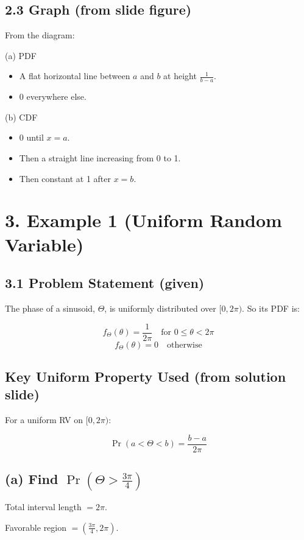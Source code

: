 \documentclass{article}
\begin{document}
\subsection*{2.3 Graph (from slide figure)}
From the diagram:

\noindent (a) PDF
\begin{itemize}
    \item A flat horizontal line between $a$ and $b$ at height $\frac{1}{b-a}$.
    \item 0 everywhere else.
\end{itemize}

\noindent (b) CDF
\begin{itemize}
    \item 0 until $x=a$.
    \item Then a straight line increasing from 0 to 1.
    \item Then constant at 1 after $x=b$.
\end{itemize}


\section*{3. Example 1 (Uniform Random Variable)}

\subsection*{3.1 Problem Statement (given)}
The phase of a sinusoid, $\Theta$, is uniformly distributed over $[0,2\pi)$.  
So its PDF is:

\[
f_\Theta(\theta)=\frac{1}{2\pi} \quad \text{for } 0\le \theta<2\pi
\]
\[
f_\Theta(\theta)=0 \quad \text{otherwise}
\]

\subsection*{Key Uniform Property Used (from solution slide)}
For a uniform RV on $[0,2\pi)$:

\[
\Pr(a<\Theta<b)=\frac{b-a}{2\pi}
\]

\subsection*{(a) Find $\Pr\left(\Theta>\frac{3\pi}{4}\right)$}
Total interval length $=2\pi$.

\noindent Favorable region $=\left(\frac{3\pi}{4},2\pi\right)$.
\end{document}
